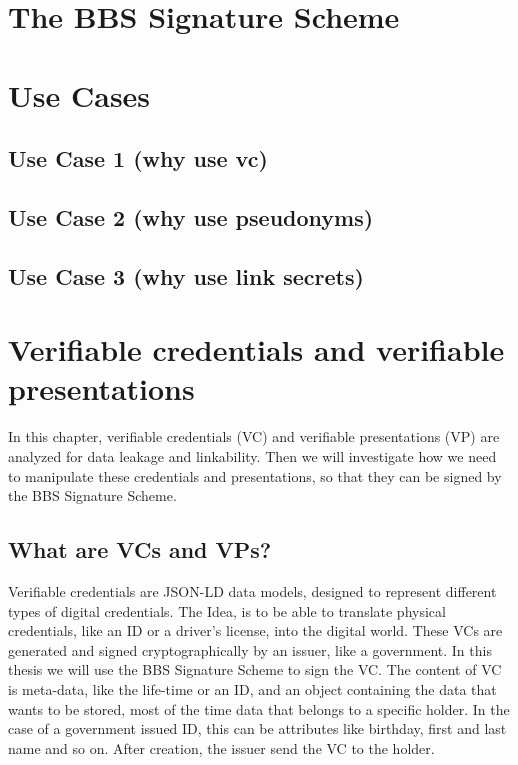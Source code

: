 \documentclass[
	a4paper               %
	,bibliography=totoc   %
	,listof=totoc         %
	,monolingual
]{bfhthesis}              %
\begin{document}
\chapter{The BBS Signature Scheme}
\label{chap:bbs}

\chapter{Use Cases}

\section{Use Case 1 (why use vc)}

\section{Use Case 2 (why use pseudonyms)}

\section{Use Case 3 (why use link secrets)}

\chapter{Verifiable credentials and verifiable presentations}
\label{chap:vpnvc}
In this chapter, verifiable credentials (VC) and verifiable presentations (VP) are analyzed for data leakage and linkability.
Then we will investigate how we need to manipulate these credentials and presentations, so that they can be signed by the BBS Signature Scheme.

\section{What are VCs and VPs?}
Verifiable credentials\cite{verifiable-credentials} are JSON-LD data models, designed to represent different types of digital credentials.
The Idea, is to be able to translate physical credentials, like an ID or a driver's license, into the digital world.
These VCs are generated and signed cryptographically by an issuer, like a government.
In this thesis we will use the BBS Signature Scheme to sign the VC.
The content of VC is meta-data, like the life-time or an ID, and an object containing the data that wants to be stored, most of the time data that belongs to a specific holder.
In the case of a government issued ID, this can be attributes like birthday, first and last name and so on.
After creation, the issuer send the VC to the holder.\\
\end{document}
